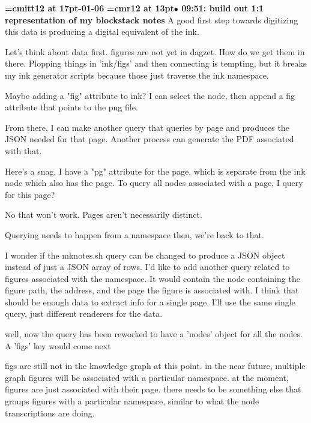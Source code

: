 {\medskip\noindent\bf\font\titlefont=cmitt12 at 17pt-01-06}\medskip
{\smallskip\noindent\bf\font\titlefont=cmr12 at 13pt\titlefont $\bullet$ 09:51: build out 1:1 representation of my blockstack notes}\smallskip
A good first step towards digitizing this data is producing a digital equivalent of the ink.
\par

Let's think about data first. figures are not yet in dagzet. How do we get them in there. Plopping things in 'ink/figs' and then connecting is tempting, but it breaks my ink generator scripts because those just traverse the ink namespace.
\par

Maybe adding a "fig" attribute to ink? I can select the node, then append a fig attribute that points to the png file.
\par

From there, I can make another query that queries by page and produces the JSON needed for that page. Another process can generate the PDF associated with that.
\par

Here's a snag. I have a "pg" attribute for the page, which is separate from the ink node which also has the page. To query all nodes associated with a page, I query for this page?
\par

No that won't work. Pages aren't necessarily distinct.
\par

Querying needs to happen from a namespace then, we're back to that.
\par

I wonder if the mknotes.sh query can be changed to produce a JSON object instead of just a JSON array of rows. I'd like to add another query related to figures associated with the namespace. It would contain the node containing the figure path, the address, and the page the figure is associated with. I think that should be enough data to extract info for a single page. I'll use the same single query, just different renderers for the data.
\par

well, now the query has been reworked to have a 'nodes' object for all the nodes. A 'figs' key would come next
\par

figs are still not in the knowledge graph at this point. in the near future, multiple graph figures will be associated with a particular namespace. at the moment, figures are just associated with their page. there needs to be something else that groups figures with a particular namespace, similar to what the node transcriptions are doing.
\par


